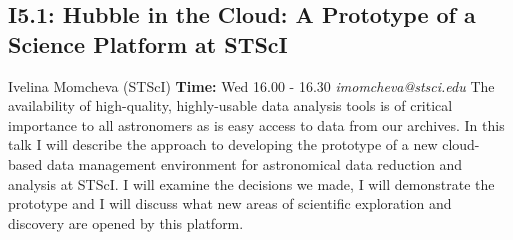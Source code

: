 \documentclass{report}
\begin{document}
\subsection*{I5.1: Hubble in the Cloud: A Prototype of a Science Platform at STScI}
\bigskip
Ivelina Momcheva (STScI) \newline   \newline   \newline   \newline  \newline  \newline\newline
{\bf Time:} Wed 16.00 - 16.30\newline
\newline
{\it imomcheva@stsci.edu}\newline
\newline\newline
The availability of high-quality, highly-usable data analysis tools is of critical importance to all astronomers as is easy access to data from our archives. In this talk I will describe the approach to developing the prototype of a new cloud-based data management environment for astronomical data reduction and analysis at STScI. I will examine the decisions we made, I will demonstrate the prototype and I will discuss what new areas of scientific exploration and discovery are opened by this platform.\newline
\newpage
\end{document}
